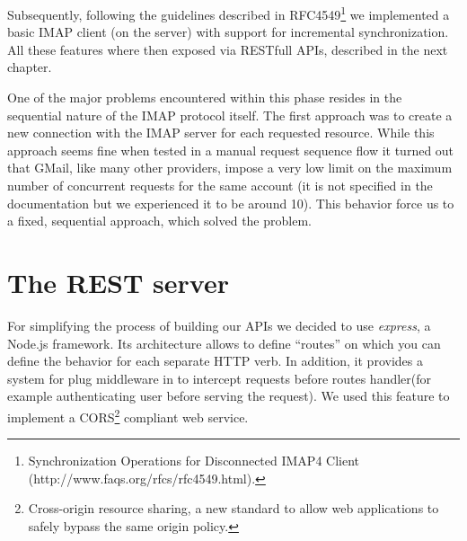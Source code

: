 \documentclass[a4paper,12pt]{report}
\begin{document}
Subsequently, following the guidelines described in RFC4549\footnote{Synchronization Operations for Disconnected IMAP4 Client (http://www.faqs.org/rfcs/rfc4549.html).} we implemented a basic IMAP client (on the server) with support for incremental synchronization. 
All these features where then exposed via RESTfull APIs, described in the next chapter.

One of the major problems encountered within this phase resides in the sequential nature of the IMAP protocol itself. The first approach was to create a new connection with the IMAP server for each requested resource. While this approach seems fine when tested in a manual request sequence flow it turned out that GMail, like many other providers, impose a very low limit on the maximum number of concurrent requests for the same account (it is not specified in the documentation but we experienced it to be around 10). This behavior force us to a fixed, sequential approach, which solved the problem.

\section{The REST server}
For simplifying the process of building our APIs we decided to use \emph{express}, a Node.js framework.
Its architecture allows to define ``routes'' on which you can define the behavior for each separate HTTP verb. In addition, it provides a system for plug middleware in to intercept requests before routes handler(for example authenticating user before serving the request). We used this feature to implement a CORS\footnote{Cross-origin resource sharing, a new standard to allow web applications to safely bypass the same origin policy.} compliant web service.
\end{document}
